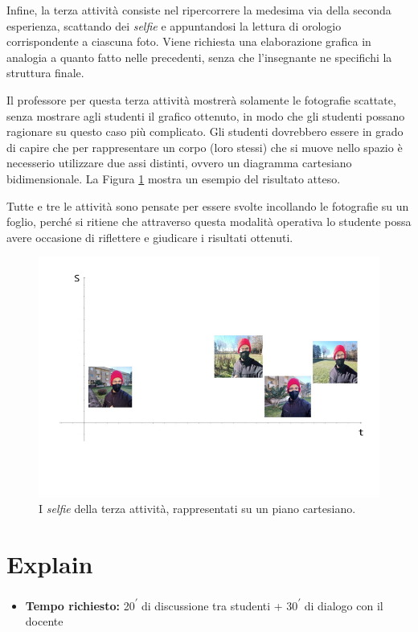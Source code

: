 \documentclass{report} \usepackage[T1]{fontenc} \usepackage[italian]{babel}
\begin{document}
Infine, la terza attività consiste nel ripercorrere la medesima via della
seconda esperienza, scattando dei \emph{selfie} e appuntandosi la lettura di orologio
corrispondente a ciascuna foto. Viene richiesta una elaborazione grafica in
analogia a quanto fatto nelle precedenti, senza che l’insegnante ne specifichi
la struttura finale.

Il professore per questa terza attività mostrerà solamente le fotografie
scattate, senza mostrare agli studenti il grafico ottenuto, in modo che gli
studenti possano ragionare su questo caso più complicato.
Gli studenti dovrebbero essere in grado di capire che per rappresentare
un corpo (loro stessi) che si muove nello spazio è necesserio utilizzare
due assi distinti, ovvero un diagramma cartesiano bidimensionale.
La Figura \ref{fig:piano_s_t} mostra un esempio del risultato atteso.

Tutte e tre le attività sono pensate per essere svolte incollando le fotografie
su un foglio, perché si ritiene che attraverso questa modalità operativa lo
studente  possa avere occasione di riflettere e giudicare i risultati ottenuti.
\begin{figure}[ht]
\centering
  \includegraphics[width=\textwidth]{piano_s_t}
  \caption{I \emph{selfie} della terza attività, rappresentati
           su un piano cartesiano.}
  \label{fig:piano_s_t}
\end{figure}

\section{Explain}\label{posizioni_istanti_explain}
\begin{itemize}
\item \textbf{Tempo richiesto:} 20\textsuperscript{$\prime$} di discussione tra
studenti + 30\textsuperscript{$\prime$} di dialogo con il docente
\end{itemize}
\end{document}
